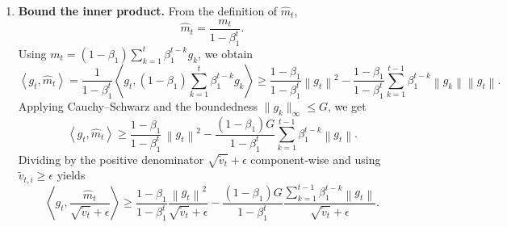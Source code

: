 \documentclass{article}
\newcommand{\norm}[1]{\left\lVert #1 \right\rVert}
\newcommand{\inner}[2]{\left\langle #1,#2 \right\rangle}
\begin{document}
\begin{enumerate}
\item[Step 5.] \textbf{Bound the inner product.}  
From the definition of $\hat m_{t}$,
\[
\hat m_{t}= \frac{m_{t}}{1-\beta_{1}^{t}}.
\]
Using $m_{t}= (1-\beta_{1})\sum_{k=1}^{t}\beta_{1}^{t-k}g_{k}$, we obtain
\[
\inner{g_{t}}{\hat m_{t}}
= \frac{1}{1-\beta_{1}^{t}}\inner{g_{t}}{(1-\beta_{1})\sum_{k=1}^{t}\beta_{1}^{t-k}g_{k}}
\ge \frac{1-\beta_{1}}{1-\beta_{1}^{t}}\norm{g_{t}}^{2} - \frac{1-\beta_{1}}{1-\beta_{1}^{t}}\sum_{k=1}^{t-1}\beta_{1}^{t-k}\norm{g_{k}}\norm{g_{t}}.
\]
Applying Cauchy–Schwarz and the boundedness $\|g_{k}\|_{\infty}\le G$, we get
\[
\inner{g_{t}}{\hat m_{t}}
\ge \frac{1-\beta_{1}}{1-\beta_{1}^{t}}\,\norm{g_{t}}^{2} - \frac{(1-\beta_{1})G}{1-\beta_{1}^{t}}\sum_{k=1}^{t-1}\beta_{1}^{t-k}\norm{g_{t}}.
\tag{5.1}
\]
Dividing by the positive denominator $\sqrt{\tilde v_{t}}+\epsilon$ component‑wise and using $\tilde v_{t,i}\ge \epsilon$ yields
\[
\inner{g_{t}}{\frac{\hat m_{t}}{\sqrt{\tilde v_{t}}+\epsilon}}
\ge \frac{1-\beta_{1}}{1-\beta_{1}^{t}}\frac{\norm{g_{t}}^{2}}{\sqrt{\tilde v_{t}}+\epsilon}
- \frac{(1-\beta_{1})G}{1-\beta_{1}^{t}}\frac{\sum_{k=1}^{t-1}\beta_{1}^{t-k}\norm{g_{t}}}{\sqrt{\tilde v_{t}}+\epsilon}.
\tag{5.2}
\]


\end{enumerate}
\end{document}
